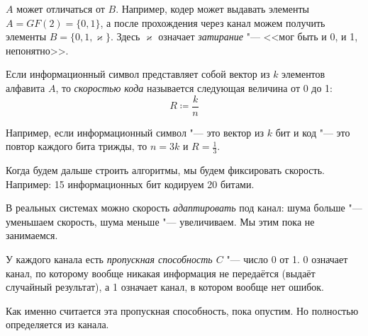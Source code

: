 \begin{exmp}
	$A$ может отличаться от $B$.
	Например, кодер может выдавать элементы $A=GF(2)=\{0, 1\}$,
	а после прохождения через канал можем получить элементы $B=\{0, 1, \varkappa\}$.
	Здесь $\varkappa$ означает \textit{затирание} "--- <<мог быть и 0, и 1, непонятно>>.
\end{exmp}

\begin{Def}
	Если информационный символ представляет собой вектор из $k$ элементов алфавита $A$,
	то \textit{скоростью кода} называется следующая величина от 0 до 1:
	\[
		R \coloneqq \frac{k}{n}
	\]
\end{Def}
\begin{exmp}
	Например, если информационный символ "--- это вектор из $k$ бит
	и код "--- это повтор каждого бита трижды, то $n=3k$ и $R=\frac13$.
\end{exmp}
\begin{Rem}
	Когда будем дальше строить алгоритмы, мы будем фиксировать скорость.
	Например: 15 информационных бит кодируем 20 битами.
\end{Rem}
\begin{Rem}
	В реальных системах можно скорость \textit{адаптировать} под канал:
	шума больше "--- уменьшаем скорость, шума меньше "--- увеличиваем.
	Мы этим пока не занимаемся.
\end{Rem}

\begin{Def}
	У каждого канала есть \textit{пропускная способность $C$} "--- число 0 от 1.
	0 означает канал, по которому вообще никакая информация не передаётся (выдаёт случайный результат),
	а 1 означает канал, в котором вообще нет ошибок.
\end{Def}
\begin{Rem}
	Как именно считается эта пропускная способность, пока опустим.
	Но полностью определяется из канала.
\end{Rem}

